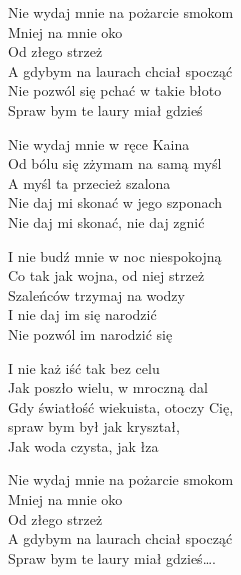 \begin{text}
    Nie wydaj mnie na pożarcie smokom\\
    Mniej na mnie oko\\
    Od złego strzeż\\
    A gdybym na laurach chciał spocząć\\
    Nie pozwól się pchać w takie błoto\\
    Spraw bym te laury miał gdzieś

    Nie wydaj mnie w ręce Kaina\\
    Od bólu się zżymam na samą myśl\\
    A myśl ta przecież szalona\\
    Nie daj mi skonać w jego szponach\\
    Nie daj mi skonać, nie daj zgnić

    I nie budź mnie w noc niespokojną\\
    Co tak jak wojna, od niej strzeż\\
    Szaleńców trzymaj na wodzy\\
    I nie daj im się narodzić\\
    Nie pozwól im narodzić się

    I nie każ iść tak bez celu\\
    Jak poszło wielu, w mroczną dal\\
    Gdy światłość wiekuista, otoczy Cię,\\
    spraw bym był jak kryształ,\\
    Jak woda czysta, jak łza

    Nie wydaj mnie na pożarcie smokom\\
    Mniej na mnie oko\\
    Od złego strzeż\\
    A gdybym na laurach chciał spocząć\\
    Spraw bym te laury miał gdzieś….
\end{text}
\begin{chord}

\end{chord}
